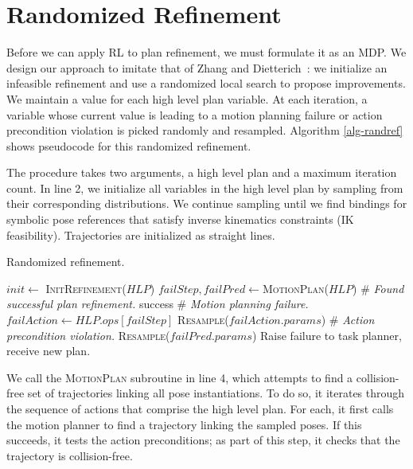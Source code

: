 \section{Randomized Refinement}
Before we can apply RL to plan refinement, we must formulate it as an MDP.
We design our approach to imitate that of Zhang and Dietterich~\cite{JobShopSched}:
we initialize an infeasible refinement and use a randomized local search to propose
improvements. We maintain a value for each high level plan
variable. At each iteration, a variable whose current value is leading to a motion planning failure or
action precondition violation is picked randomly and resampled.
Algorithm \ref{alg-randref} shows pseudocode for this randomized refinement.

The procedure takes two arguments, a high level plan and a maximum
iteration count. In line 2, we initialize all variables in the high level plan by sampling
from their corresponding distributions. We continue sampling
until we find bindings for symbolic pose references that satisfy
inverse kinematics constraints (IK feasibility). Trajectories are
initialized as straight lines.

\begin{algorithm}[t]
 \caption{Randomized refinement.} \label{alg-randref}
 \begin{algorithmic}[1]
  \State $init \leftarrow$ \textsc{InitRefinement}($HLP$)
  \State $failStep, failPred \leftarrow $\textsc{MotionPlan}($HLP$)
  \State \# \emph{Found successful plan refinement.}
  \State \Return success
  \EndIf
  \State \# \emph{Motion planning failure.}
  \State $failAction \leftarrow HLP.ops[failStep]$
  \State \textsc{Resample}($failAction.params$)
  \Else
  \State \# \emph{Action precondition violation.}
  \State \textsc{Resample}($failPred.params$)
  \EndIf
  \EndFor
  \State Raise failure to task planner, receive new plan.
  \EndProcedure
 \end{algorithmic}
\end{algorithm}

We call the \textsc{MotionPlan} subroutine in line 4, which attempts to
find a collision-free set of trajectories linking all pose instantiations.
To do so, it iterates through the sequence of actions that comprise the high level plan.
For each, it first calls the motion planner to find a trajectory
linking the sampled poses. If this succeeds, it tests the action preconditions;
as part of this step, it checks that the trajectory is collision-free.

